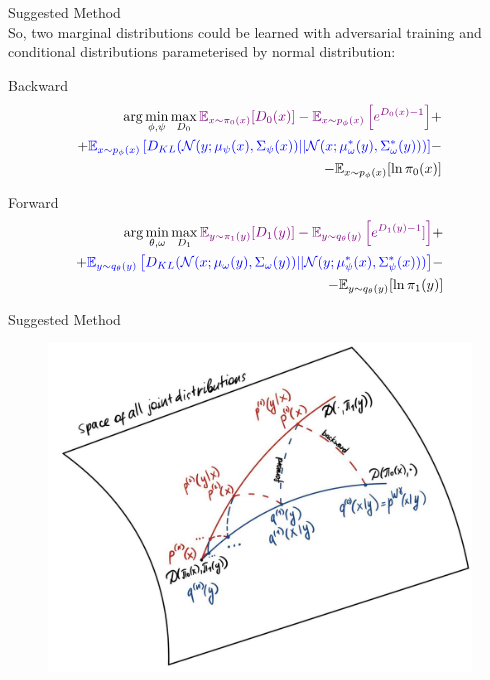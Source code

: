 \documentclass[10pt,pdf,hyperref={unicode}]{beamer}
\begin{document}
\begin{frame}{Suggested Method}
~\\[-1mm]
So, two marginal distributions could be learned with adversarial training and conditional distributions parameterised by normal distribution:
\begin{block}{Backward}
    \begin{equation*}
        \begin{split}
            \arg\min_{\phi, \psi}\max_{D_0} {\color{violet}\mathbb{E}_{x\sim \pi_0(x)}[D_0(x)] - \mathbb{E}_{x\sim p_\phi(x)}\left[e^{D_0(x) - 1}\right]} + \\
            + {\color{blue}\mathbb{E}_{x\sim p_\phi(x)}\left[D_{KL}(\mathcal{N}(y; \mu_\psi(x), \Sigma_\psi(x))||\mathcal{N}(x; \mu^*_\omega(y), \Sigma^*_\omega(y)))\right]} - \\ - \mathbb{E}_{x\sim p_\phi(x)}[\ln \pi_0(x)]
        \end{split}
    \end{equation*}
\end{block}

\begin{block}{Forward}
    \begin{equation*}
        \begin{split}
            \arg\min_{\theta, \omega}\max_{D_1} {\color{violet}\mathbb{E}_{y\sim \pi_1(y)}[D_1(y)] - \mathbb{E}_{y\sim q_\theta(y)}\left[e^{D_1(y) - 1}]\right]} + \\
            +  {\color{blue}\mathbb{E}_{y\sim q_\theta(y)}\left[D_{KL}(\mathcal{N}(x; \mu_\omega(y), \Sigma_\omega(y))||\mathcal{N}(y; \mu^*_\psi(x), \Sigma^*_\psi(x)))\right]} - \\ - \mathbb{E}_{y\sim q_\theta(y)}[\ln \pi_1(y)]
        \end{split}
    \end{equation*}
\end{block}
\end{frame}
\begin{frame}{Suggested Method}
~\\[-1mm]
    \begin{figure}
        \centering
        \includegraphics[width=0.8\linewidth]{slides/3d/figures/photo_2023-12-16_13-49-39.jpg}
    \end{figure}
\end{frame}
\end{document}
